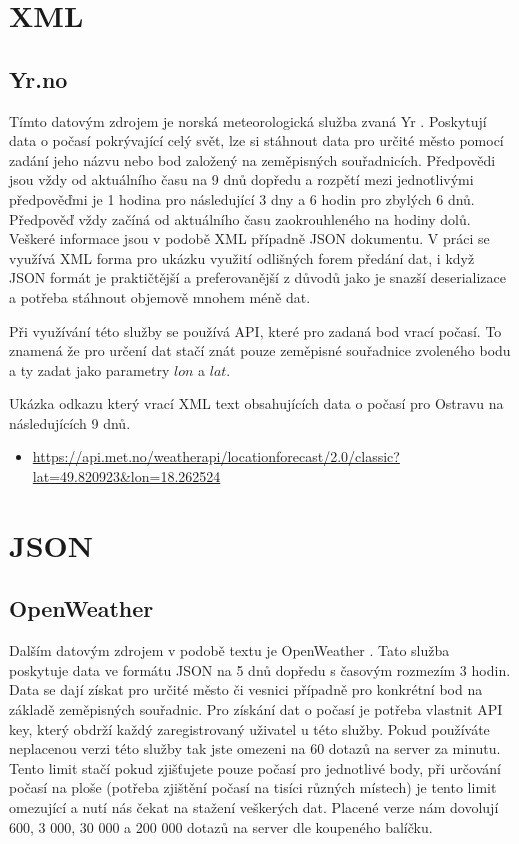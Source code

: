 \documentclass[czech,bachelor,dept460,male,csharp,cpdeclaration]{diploma}
\begin{document}
	\section{XML}
	\subsection{Yr.no}
	
	Tímto datovým zdrojem je norská meteorologická služba zvaná Yr \cite{yrno}. Poskytují data o počasí pokrývající celý svět, lze si stáhnout data pro určité město pomocí zadání jeho názvu nebo bod založený na zeměpisných souřadnicích. Předpovědi jsou vždy od aktuálního času na 9 dnů dopředu a rozpětí mezi jednotlivými předpověďmi je 1 hodina pro následující 3 dny a 6 hodin pro zbylých 6 dnů. Předpověď vždy začíná od aktuálního času zaokrouhleného na hodiny dolů. Veškeré informace jsou v podobě XML případně JSON dokumentu. V práci se využívá XML forma pro ukázku využití odlišných forem předání dat, i když JSON formát je praktičtější a preferovanější z důvodů jako je snazší deserializace a potřeba stáhnout objemově mnohem méně dat.
	
	Při využívání této služby se používá API, které pro zadaná bod vrací počasí. To znamená že pro určení dat stačí znát pouze zeměpisné souřadnice zvoleného bodu a ty zadat jako parametry $lon$ a $lat$.
	
	Ukázka odkazu který vrací XML text obsahujících data o počasí pro Ostravu na následujících 9 dnů.
	\begin{itemize}
		\item \url{https://api.met.no/weatherapi/locationforecast/2.0/classic?lat=49.820923\&lon=18.262524}
	\end{itemize}
	
	\section{JSON}
	\subsection{OpenWeather}
	
	Dalším datovým zdrojem v podobě textu je OpenWeather \cite{owm}. Tato služba poskytuje data ve formátu JSON na 5 dnů dopředu s časovým rozmezím 3 hodin. Data se dají získat pro určité město či vesnici případně pro konkrétní bod na základě zeměpisných souřadnic. Pro získání dat o počasí je potřeba vlastnit API key, který obdrží každý zaregistrovaný uživatel u této služby. Pokud používáte neplacenou verzi této služby tak jste omezeni na 60 dotazů na server za minutu. Tento limit stačí pokud zjišťujete pouze počasí pro jednotlivé body, při určování počasí na ploše (potřeba zjištění počasí na tisíci různých místech) je tento limit omezující a nutí nás čekat na stažení veškerých dat. Placené verze nám dovolují 600, 3 000, 30 000 a 200 000 dotazů na server dle koupeného balíčku.
	
\end{document}
